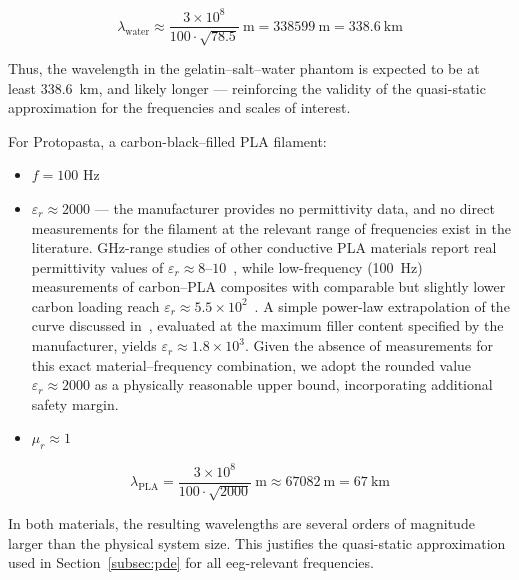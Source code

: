 \[
\lambda_{\text{water}} \approx \frac{3 \times 10^8}{100 \cdot \sqrt{78.5}}~\text{m}
= 338 599~\text{m} = 338.6~\text{km}
\]

Thus, the wavelength in the gelatin–salt–water phantom is expected to be at least 338.6~km, and likely longer — reinforcing the validity of the quasi-static approximation for the frequencies and scales of interest.

For Protopasta, a carbon-black–filled PLA filament:
\begin{itemize}
  \item $f = 100$ Hz
    \item $\varepsilon_r \approx 2000$ --- the manufacturer provides no permittivity data, and no direct measurements for the filament at the relevant range of frequencies exist in the literature. GHz-range studies of other conductive PLA materials report real permittivity values of $\varepsilon_r \approx 8$–$10$~\cite{marquez-segura-2021}, while low-frequency (100~Hz) measurements of carbon–PLA composites with comparable but slightly lower carbon loading reach $\varepsilon_r \approx 5.5\times 10^2$~\cite{spinelli-2020}. A simple power-law extrapolation of the curve discussed in~\cite{spinelli-2020}, evaluated at the maximum filler content specified by the manufacturer, yields $\varepsilon_r \approx 1.8\times 10^3$. Given the absence of measurements for this exact material–frequency combination, we adopt the rounded value $\varepsilon_r \approx 2000$ as a physically reasonable upper bound, incorporating additional safety margin.

  \item $\mu_r \approx 1$~\cite{america-no-date}
\end{itemize}

\[
\lambda_{\text{PLA}} = \frac{3 \times 10^8}{100 \cdot \sqrt{2000}} ~\text{m} \approx 67 082~\text{m} = 67~\text{km}
\]

\noindent
In both materials, the resulting wavelengths are several orders of magnitude larger than the physical system size. This justifies the quasi-static approximation used in Section~\ref{subsec:pde} for all \gls{eeg}-relevant frequencies.
